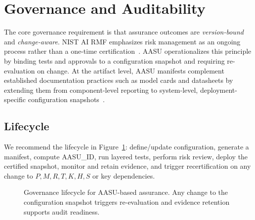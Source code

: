 \documentclass[11pt]{article}
\newcommand{\AASU}{\textsc{AASU}}
\begin{document}
\section{Governance and Auditability}
The core governance requirement is that assurance outcomes are \emph{version-bound} and \emph{change-aware}.
NIST AI RMF emphasizes risk management as an ongoing process rather than a one-time certification~\cite{nist_airmf}.
\AASU{} operationalizes this principle by binding tests and approvals to a configuration snapshot and requiring re-evaluation on change.
At the artifact level, \AASU{} manifests complement established documentation practices such as model cards and datasheets by extending them from component-level reporting to
system-level, deployment-specific configuration snapshots~\cite{model_cards,datasheets}.

\subsection{Lifecycle}
We recommend the lifecycle in Figure~\ref{fig:lifecycle}: define/update configuration, generate a manifest, compute \AASU\_ID, run layered tests, perform risk review,
deploy the certified snapshot, monitor and retain evidence, and trigger recertification on any change to $P,M,R,T,K,H,S$ or key dependencies.

\begin{figure}[t]
  \centering
  \caption{Governance lifecycle for \AASU{}-based assurance. Any change to the configuration snapshot triggers re-evaluation and evidence retention supports audit readiness.}
  \label{fig:lifecycle}
\end{figure}
\end{document}
